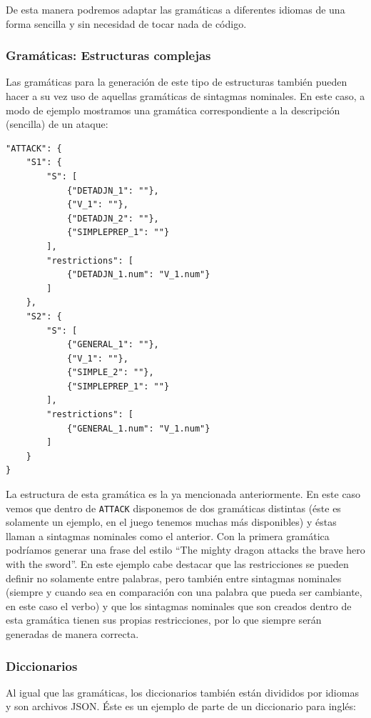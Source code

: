 De esta manera podremos adaptar las gramáticas a diferentes idiomas de una forma sencilla y sin necesidad de tocar nada de código.

\subsubsection{Gramáticas: Estructuras complejas}

Las gramáticas para la generación de este tipo de estructuras también pueden hacer a su vez uso de aquellas gramáticas de sintagmas nominales. En este caso, a modo de ejemplo mostramos una gramática correspondiente a la descripción (sencilla) de un ataque: 

\begin{lstlisting}[style=json]
"ATTACK": {
	"S1": {
	    "S": [
	        {"DETADJN_1": ""},
	        {"V_1": ""},
	        {"DETADJN_2": ""},
	        {"SIMPLEPREP_1": ""}
	    ],
	    "restrictions": [
	        {"DETADJN_1.num": "V_1.num"}
	    ]
	},
	"S2": {
	    "S": [
	        {"GENERAL_1": ""},
	        {"V_1": ""},
	        {"SIMPLE_2": ""},
	        {"SIMPLEPREP_1": ""}
	    ],
	    "restrictions": [
	        {"GENERAL_1.num": "V_1.num"}
	    ]
	}
}
\end{lstlisting}

\noindent La estructura de esta gramática es la ya mencionada anteriormente. En este caso vemos que dentro de \texttt{ATTACK} disponemos de dos gramáticas distintas (éste es solamente un ejemplo, en el juego tenemos muchas más disponibles) y éstas llaman a sintagmas nominales como el anterior.
Con la primera gramática podríamos generar una frase del estilo ``The mighty dragon attacks the brave hero with the sword''. En este ejemplo cabe destacar que las restricciones se pueden definir no solamente entre palabras, pero también entre sintagmas nominales (siempre y cuando sea en comparación con una palabra que pueda ser cambiante, en este caso el verbo) y que los sintagmas nominales que son creados dentro de esta gramática tienen sus propias restricciones, por lo que siempre serán generadas de manera correcta.

\subsubsection{Diccionarios}

Al igual que las gramáticas, los diccionarios también están divididos por idiomas y son archivos JSON. Éste es un ejemplo de parte de un diccionario para inglés:

